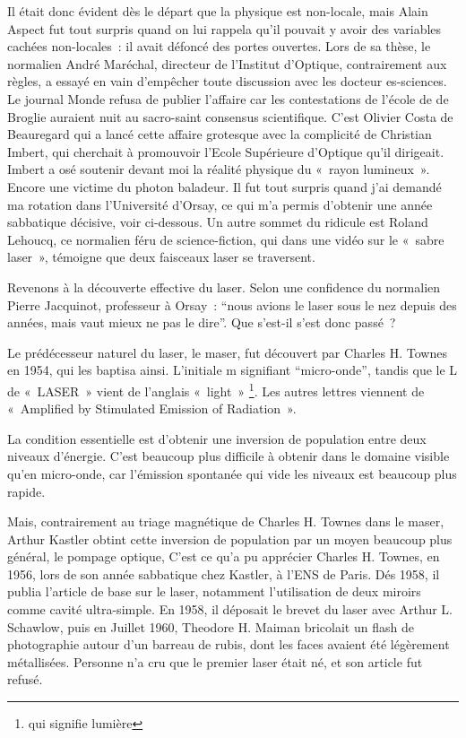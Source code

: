 \documentclass[a4paper,12pt]{article}
\begin{document}
Il était donc évident dès le départ que la physique est non-locale, mais Alain Aspect fut tout surpris quand on lui rappela qu'il pouvait y avoir des variables cachées non-locales : il avait défoncé des portes ouvertes. Lors de sa thèse, le normalien André Maréchal, directeur de l'Institut d'Optique, contrairement aux règles, a essayé en vain d'empêcher toute discussion avec les docteur es-sciences. Le journal Monde refusa de publier l'affaire car les contestations de l'école de de Broglie auraient nuit au sacro-saint consensus scientifique. C'est Olivier Costa de Beauregard qui a lancé cette affaire grotesque avec la complicité de Christian Imbert, qui cherchait à promouvoir l'Ecole Supérieure d'Optique qu'il dirigeait. Imbert a osé soutenir devant moi la réalité physique du « rayon lumineux ». Encore une victime du photon baladeur. Il fut tout surpris quand j'ai demandé ma rotation dans l'Université d'Orsay, ce qui m'a permis d'obtenir une année sabbatique décisive, voir ci-dessous. Un autre sommet du ridicule est Roland Lehoucq, ce normalien féru de science-fiction, qui dans une vidéo sur le « sabre laser », témoigne que deux faisceaux laser se traversent.

Revenons à la découverte effective du laser. Selon une confidence du normalien  Pierre Jacquinot, professeur à Orsay : ``nous avions le laser sous le nez depuis des années, mais vaut mieux ne pas le dire''. Que s'est-il s'est donc passé ?

Le prédécesseur naturel du laser, le maser, fut découvert par Charles H. Townes en 1954, qui les baptisa ainsi. L'initiale m signifiant ``micro-onde'', tandis que le L de « LASER » vient de l'anglais « light » \footnote{qui signifie lumière}. Les autres lettres viennent de « Amplified by Stimulated Emission of Radiation ». 

La condition essentielle est d'obtenir une inversion de population entre deux niveaux d'énergie. C'est beaucoup plus difficile à obtenir dans le domaine visible qu'en micro-onde, car l'émission spontanée qui vide les niveaux est beaucoup plus rapide. 

Mais, contrairement au triage magnétique de Charles H. Townes dans le maser, Arthur Kastler obtint cette inversion de population par un moyen beaucoup plus général, le pompage optique,  C'est ce qu'a pu apprécier Charles H. Townes, en 1956, lors de son année sabbatique  chez Kastler, à l'ENS de Paris. Dés 1958, il publia l'article de base sur le laser, notamment l'utilisation de deux miroirs comme cavité ultra-simple. En 1958, il déposait le brevet du laser avec Arthur L. Schawlow, puis en Juillet 1960, Theodore H. Maiman bricolait un flash de photographie autour d'un barreau de rubis, dont les faces avaient été légèrement métallisées. Personne n'a cru que le premier laser était né, et son article fut refusé. 
\end{document}

